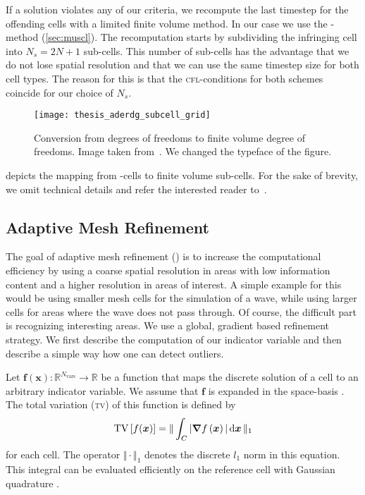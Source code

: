 If a solution violates any of our criteria, we recompute the last timestep for the offending cells with a limited finite volume method.
In our case we use the \muscl{}-method (\cref{sec:muscl}).
The recomputation starts by subdividing the infringing cell into $N_s = 2N + 1$ sub-cells.
This number of sub-cells has the advantage that we do not lose spatial resolution and that we can use the same timestep size for both cell types.
The reason for this is that the \textsc{cfl}-conditions for both schemes  coincide for our choice of $N_s$.
\begin{figure}[htb]
  \centering
  \texttt{[image: thesis\_aderdg\_subcell\_grid]}
  \caption{\label{fig:limiting-subcells}Conversion from \dg{} degrees of freedoms to finite volume degree of freedoms. Image taken from~\cite{dumbser2018conformal}. We changed the typeface of the figure.}
\end{figure}
 depicts the mapping from \dg{}-cells to finite volume sub-cells.
For the sake of brevity, we omit technical details and refer the interested reader to~\cite{dumbser2016simple}.

\subsection{Adaptive Mesh Refinement}\label{sec:amr}
The goal of adaptive mesh refinement (\amr{}) is to increase the computational efficiency by using a coarse spatial resolution in areas with low information content and a higher resolution in areas of interest.
A simple example for this would be using smaller mesh cells for the simulation of a wave, while using larger cells for areas where the wave does not pass through.
Of course, the difficult part is recognizing interesting areas.
We use a global, gradient based refinement strategy.
We first describe the computation of our indicator variable and then describe a simple way how one can detect outliers.

Let $\bm{f}(\bm{x}): \mathbb{R}^{N_\text{vars}} \to \mathbb{R}$ be a function that maps the discrete solution of a cell to an arbitrary indicator variable.
We assume that $\bm{f}$ is expanded in the space-basis .
The total variation (\textsc{tv}) of this function is defined by
\begin{equation}
  \label{eq:tv}
  \tv \left[ f(\bm{x}) \right] =
  \Vert
\intdcell{ \vert \gradient{f \left( \bm{x} \right)} \vert }
\Vert_1
\end{equation}
for each cell.
The operator $\Vert \cdot \Vert_1$ denotes the discrete $l_1$ norm in this equation.
This integral can be evaluated efficiently on the reference cell  with Gaussian quadrature .

